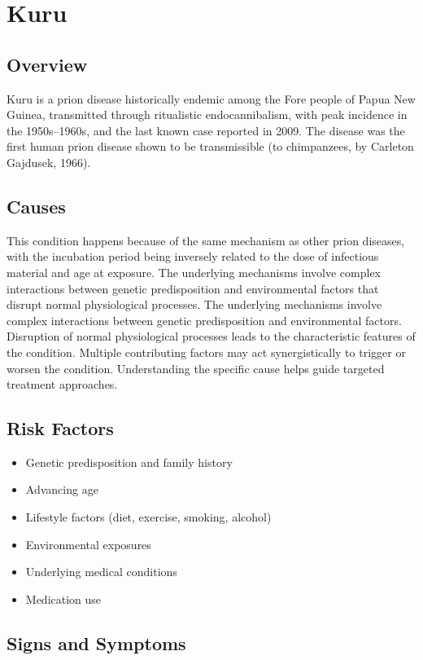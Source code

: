 \chapter{Kuru}
\label{sec:Kuru}

\section{Overview}
Kuru is a prion disease historically endemic among the Fore people of Papua New Guinea, transmitted through ritualistic endocannibalism, with peak incidence in the 1950s--1960s, and the last known case reported in 2009. The disease was the first human prion disease shown to be transmissible (to chimpanzees, by Carleton Gajdusek, 1966).
\section{Causes}
This condition happens because of the same mechanism as other prion diseases, with the incubation period being inversely related to the dose of infectious material and age at exposure. The underlying mechanisms involve complex interactions between genetic predisposition and environmental factors that disrupt normal physiological processes. The underlying mechanisms involve complex interactions between genetic predisposition and environmental factors. Disruption of normal physiological processes leads to the characteristic features of the condition. Multiple contributing factors may act synergistically to trigger or worsen the condition. Understanding the specific cause helps guide targeted treatment approaches.
\section{Risk Factors}


\begin{itemize}[noitemsep]
  \item Genetic predisposition and family history
  \item Advancing age
  \item Lifestyle factors (diet, exercise, smoking, alcohol)
  \item Environmental exposures
  \item Underlying medical conditions
  \item Medication use
\end{itemize}
\section{Signs and Symptoms}

